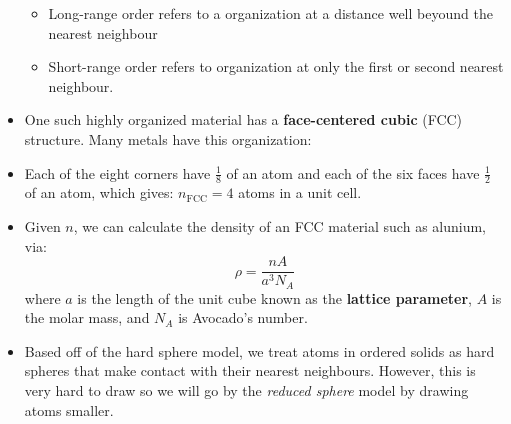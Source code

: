 \begin{itemize}
    \begin{itemize}
        \item Long-range order refers to a organization at a distance well beyound the nearest neighbour
        \item Short-range order refers to organization at only the first or second nearest neighbour.
    \end{itemize}
    \item One such highly organized material has a \textbf{face-centered cubic} (FCC) structure. Many metals have this organization:
    \begin{figure}[ht]
        \centering
    \end{figure}
    \item Each of the eight corners have $\frac{1}{8}$ of an atom and each of the six faces have $\frac{1}{2}$ of an atom, which gives: $n_\text{FCC}=4$ atoms in a unit cell.
    \item Given $n$, we can calculate the density of an FCC material such as alunium, via:
    \begin{equation}
        \rho = \frac{n A}{a^3N_A}
    \end{equation}
    where $a$ is the length of the unit cube known as the \textbf{lattice parameter}, $A$ is the molar mass, and $N_A$ is Avocado's number.
    \item Based off of the hard sphere model, we treat atoms in ordered solids as hard spheres that make contact with their nearest neighbours. However, this is very hard to draw so we will go by the \textit{reduced sphere} model by drawing atoms smaller.
\end{itemize}